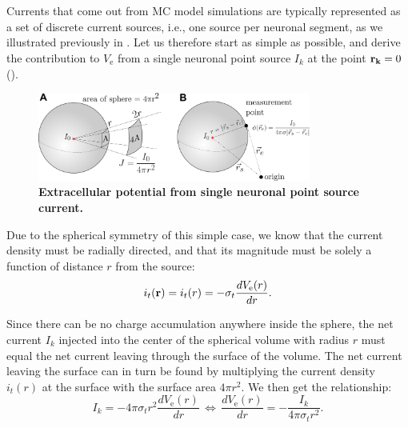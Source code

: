 \section{}
\label{sec:VC:pointsource}
Currents that come out from MC model simulations are typically represented as 
a set of discrete current sources, i.e., one source per neuronal segment, as we illustrated previously in . Let us therefore start as simple as possible, 
and derive the contribution to $V_\mathrm{e}$ from a single neuronal point source 
$I_k$ at the point ${\bf r_k}=0$ ().

\begin{figure}[!ht]
\begin{center}
\includegraphics[width=0.8\textwidth]{Figures/VC/EP_from_pointsource_illustration.png}
\end{center}
\caption{\textbf{Extracellular potential from single neuronal point source current.} 
}
\label{fig:VC:pointsource}
\end{figure}
Due to the spherical symmetry of this simple case, we know that the current density 
must be radially directed, and that its magnitude must be solely a function of distance $r$ from the source:
\begin{equation}
i_t({\bf r}) = i_t(r) = -\sigma_t \frac{dV_\mathrm{e}(r)}{dr}.
\end{equation}

Since there can be no charge accumulation anywhere inside the sphere, 
the net current $I_k$ injected into the center of the spherical volume with radius $r$ 
must equal the net current leaving through the surface of the volume. 
The net current leaving the surface can in turn be found by multiplying 
the current density $i_t(r)$ at the surface with the surface area $4\pi r^2$. 
We then get the relationship:
\begin{equation}
I_k = -4\pi \sigma_t r^2  \frac{dV_\mathrm{e}(r)}{dr} \, \iff \, \frac{dV_\mathrm{e}(r)}{dr} = -\frac{I_k}{4\pi \sigma_t r^2 }.
\label{eq:VC:knut}
\end{equation}


